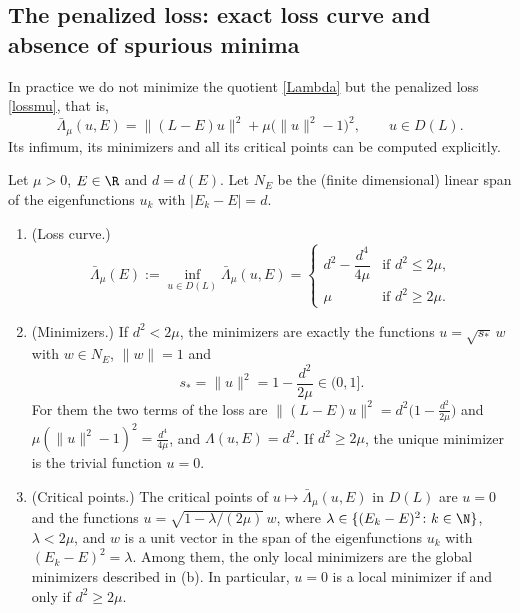 
\subsection*{The penalized loss: exact loss curve and absence of spurious minima}

In practice we do not minimize the quotient \eqref{Lambda} but the penalized loss
\eqref{lossmu}, that is,
\[
\bar\Lambda_\mu(u,E)=\|(L-E)u\|^2+\mu\big(\|u\|^2-1\big)^2,\qquad u\in D(L).
\]
Its infimum, its minimizers and all its critical points can be computed explicitly.

\begin{proposition}\label{prop.penalized}
Let $\mu>0$, $E\in\R$ and $d=d(E)$. Let $N_E$ be the (finite dimensional) linear span of
the eigenfunctions $u_k$ with $|E_k-E|=d$.
\begin{enumerate}
\item[(a)] (Loss curve.)
\[
\bar\Lambda_\mu(E):=\inf_{u\in D(L)}\bar\Lambda_\mu(u,E)=
\begin{cases}
d^2-\dfrac{d^4}{4\mu} & \text{if } d^2\le 2\mu,\\[2mm]
\mu & \text{if } d^2\ge 2\mu .
\end{cases}
\]
\item[(b)] (Minimizers.) If $d^2<2\mu$, the minimizers are exactly the functions
$u=\sqrt{s_*}\,w$ with $w\in N_E$, $\|w\|=1$ and
\[
s_*=\|u\|^2=1-\frac{d^2}{2\mu}\in(0,1].
\]
For them the two terms of the loss are
$\|(L-E)u\|^2=d^2\big(1-\frac{d^2}{2\mu}\big)$ and
$\mu(\|u\|^2-1)^2=\frac{d^4}{4\mu}$, and $\Lambda(u,E)=d^2$.
If $d^2\ge 2\mu$, the unique minimizer is the trivial function $u=0$.
\item[(c)] (Critical points.) The critical points of $u\mapsto\bar\Lambda_\mu(u,E)$ in
$D(L)$ are $u=0$ and the functions $u=\sqrt{1-\lambda/(2\mu)}\,w$, where
$\lambda\in\{(E_k-E)^2\colon k\in\N\}$, $\lambda<2\mu$, and $w$ is a unit vector in the
span of the eigenfunctions $u_k$ with $(E_k-E)^2=\lambda$. Among them, the only local
minimizers are the global minimizers described in (b). In particular, $u=0$ is a local
minimizer if and only if $d^2\ge 2\mu$.
\end{enumerate}
\end{proposition}

